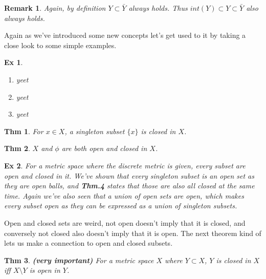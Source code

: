 \documentclass[paper=a4, fontsize=11pt]{scrartcl}
\newtheorem{theorem}{Thm}
\newtheorem{example}{Ex}
\newtheorem*{remark}{Remark}
\begin{document}
\begin{remark}
	Again, by definition $Y \subset \bar{Y}$ always holds. Thus $int(Y)\subset Y\subset \bar{Y}$ also always holds.
\end{remark}

Again as we've introduced some new concepts let's get used to it by taking a close look to some simple examples.\\
\begin{example}
$ $ \newline
\vspace{-0.15in}
\begin{enumerate}[label=\arabic*)]
	\item yeet
	\item yeet
	\item yeet\\
\end{enumerate}
\end{example}

\begin{theorem}
	For $x \in X$, a singleton subset $\{x\}$ is closed in $X$.\\
\end{theorem}

\begin{theorem}
	 $X$ and $\phi$ are both open and closed in $X$.\\
\end{theorem}

\begin{example}
	For a metric space where the discrete metric is given, every subset are open and closed in it. We've shown that every singleton subset is an open set as they are open balls, and \textbf{Thm.4} states that those are also all closed at the same time. Again we've also seen that a union of open sets are open, which makes every subset open as they can be expressed as a union of singleton subsets. \\
\end{example}

Open and closed sets are weird, not open doesn't imply that it is closed, and conversely not closed also doesn't imply that it is open. The next theorem kind of lets us make a connection to open and closed subsets.\\

\begin{theorem}
\textbf{(very important)} 
 For a metric space $X$ where $Y \subset X$, $Y$ is closed in $X$ iff $X\setminus Y$ is open in $Y$.\\
\end{theorem}
\end{document}
